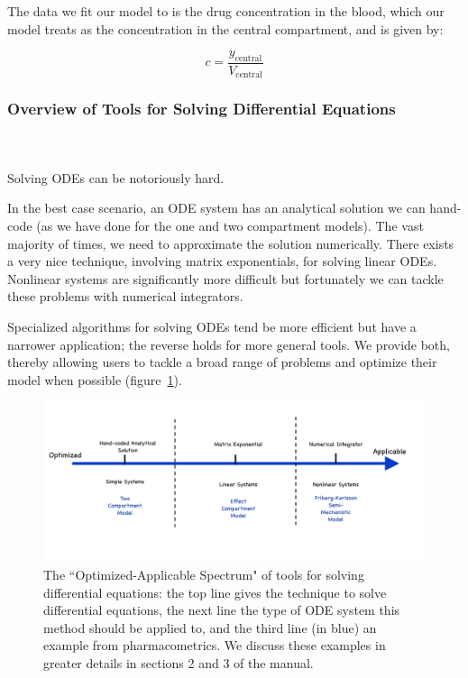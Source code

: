 \documentclass[11pt]{amsart}
\begin{document}
The data we fit our model to is the drug concentration in the blood, which our model treats as the concentration in the central compartment, and is given by:

$$ c = \frac{y_{\mathrm{central}}}{V_{\mathrm{central}}} $$

\subsubsection{Overview of Tools for Solving Differential Equations} \ \\ \ \\
Solving ODEs can be notoriously hard.

In the best case scenario, an ODE system has an analytical solution we can hand-code (as we have done for the one and two compartment models). The vast majority of times, we need to approximate the solution numerically. There exists a very nice technique, involving matrix exponentials, for solving linear ODEs. Nonlinear systems are significantly more difficult but fortunately we can tackle these problems with numerical integrators.

Specialized algorithms for solving ODEs tend be more efficient but have a narrower application; the reverse holds for more general tools. We provide both, thereby allowing users to tackle a broad range of problems and optimize their model when possible  (figure~\ref{DiffEqTools}).

\begin{figure}[!htb]
\begin{center}
\includegraphics[width=6.5in,trim=0in 0in 0 0in]{graphics/appendix/ODEsolvers_ext.png}
\caption{{The ``Optimized-Applicable Spectrum" of tools for solving differential equations: the top line gives the technique to solve differential equations, the next line the type of ODE system this method should be applied to, and the third line (in blue) an example from pharmacometrics. We discuss these examples in greater details in sections 2 and 3 of the manual.}}
\label{DiffEqTools}
\end{center}
\end{figure}
\end{document}
